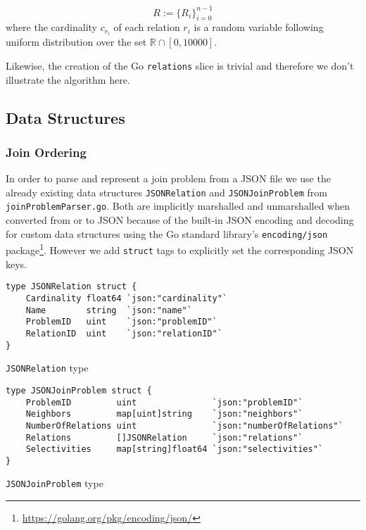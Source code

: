 \begin{equation}
R := \{R_i\}_{i=0}^{n-1}
\end{equation}
where the cardinality $c_{r_i}$ of each relation $r_i$ is a random variable following uniform distribution over the set $\mathbb{R} \cap [0,10000]$.

Likewise, the creation of the Go \texttt{relations} slice is trivial and therefore we don't illustrate the algorithm here.

\subsection{Data Structures}
\label{sub:data-structures}

\subsubsection{Join Ordering}
In order to parse and represent a join problem from a JSON file we use the already existing data structures \texttt{JSONRelation} and \texttt{JSONJoinProblem} from \texttt{joinProblemParser.go}. Both are implicitly marshalled and unmarshalled when converted from or to JSON because of the built-in JSON encoding and decoding for custom data structures using the Go standard library's \texttt{encoding/json} package\footnote{\url{https://golang.org/pkg/encoding/json/}}. However we add \texttt{struct} tags to explicitly set the corresponding JSON keys.
\vspace{0.6cm}

\begin{code}
\begin{verbatim}
type JSONRelation struct {
    Cardinality float64 `json:"cardinality"`
    Name        string  `json:"name"`
    ProblemID   uint    `json:"problemID"`
    RelationID  uint    `json:"relationID"`
}
\end{verbatim}
\caption{\texttt{JSONRelation} type}
\end{code}
\vspace{0.6cm}

\begin{code}
\begin{verbatim}
type JSONJoinProblem struct {
    ProblemID         uint               `json:"problemID"`
    Neighbors         map[uint]string    `json:"neighbors"`
    NumberOfRelations uint               `json:"numberOfRelations"`
    Relations         []JSONRelation     `json:"relations"`
    Selectivities     map[string]float64 `json:"selectivities"`
}
\end{verbatim}
\caption{\texttt{JSONJoinProblem} type}
\end{code}
\vspace{0.8cm}

